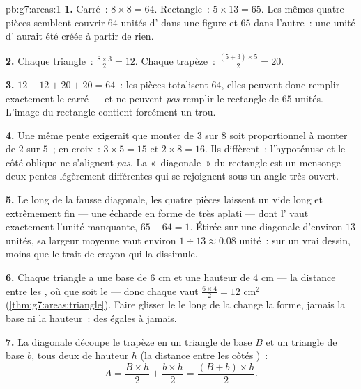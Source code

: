 \begin{solution}{pb:g7:areas:1}
\textbf{1.} Carré~: $8 \times 8 = 64$. Rectangle~:
$5 \times 13 = 65$. Les mêmes quatre pièces semblent couvrir $64$
unités d' dans une figure et $65$ dans l'autre~: une unité
d' aurait été créée à partir de rien.

\textbf{2.} Chaque triangle~: $\frac{8 \times 3}{2} = 12$. Chaque
trapèze~: $\frac{(5 + 3) \times 5}{2} = 20$.

\textbf{3.} $12 + 12 + 20 + 20 = 64$~: les pièces totalisent $64$,
elles peuvent donc remplir exactement le carré --- et ne peuvent
\emph{pas} remplir le rectangle de $65$ unités. L'image du rectangle
contient forcément un trou.

\textbf{4.} Une même pente exigerait que monter de $3$ sur $8$ soit
proportionnel à monter de $2$ sur $5$~;  en croix~:
$3 \times 5 = 15$ et $2 \times 8 = 16$. Ils diffèrent~: l'hypoténuse
et le côté oblique ne s'alignent \emph{pas}. La «~diagonale~» du
rectangle est un mensonge --- deux pentes légèrement différentes qui
se rejoignent sous un angle très ouvert.

\textbf{5.} Le long de la fausse diagonale, les quatre pièces
laissent un vide long et extrêmement fin --- une écharde en forme de
 très aplati --- dont l' vaut exactement l'unité
manquante, $65 - 64 = 1$. Étirée sur une diagonale d'environ $13$
unités, sa largeur moyenne vaut environ
$1 \div 13 \approx 0.08$ unité~: sur un vrai dessin, moins que le
trait de crayon qui la dissimule.

\textbf{6.} Chaque triangle a une base de $6$ cm et une hauteur de
$4$ cm --- la distance entre les , où que soit le 
--- donc chaque  vaut $\frac{6 \times 4}{2} = 12$ cm$^2$
(\cref{thm:g7:areas:triangle}). Faire glisser le  le long de
la  change la forme, jamais la base ni la hauteur~: des
 égales à jamais.

\textbf{7.} La diagonale découpe le trapèze en un triangle de base
$B$ et un triangle de base $b$, tous deux de hauteur $h$ (la
distance entre les côtés )~:
\[
A = \frac{B \times h}{2} + \frac{b \times h}{2}
= \frac{(B + b) \times h}{2} .
\]


\end{solution}

